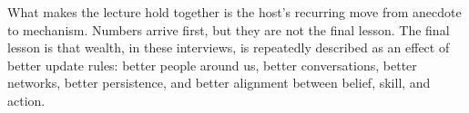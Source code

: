 What makes the lecture hold together is the host's recurring move from anecdote to mechanism. Numbers arrive first, but they are not the final lesson. The final lesson is that wealth, in these interviews, is repeatedly described as an effect of better update rules: better people around us, better conversations, better networks, better persistence, and better alignment between belief, skill, and action.